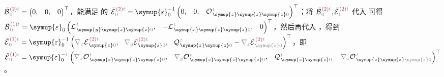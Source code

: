 $\bar{\mathcal{B}}^{\;\!\textcolor{Maroon}{(2)}\mathcolor{gray}{t}}_{\;\!  \mathcolor{gray}{0}} = \begin{pmatrix} 0, & 0, & 0 \end{pmatrix}^\top$，能满足  的 $\bar{\mathcal{E}}^{\;\!\textcolor{Maroon}{(2)}\mathcolor{gray}{t}}_{\;\!  \mathcolor{gray}{0}} = {\symup{\varepsilon}}_0^{-1} \begin{pmatrix} 0, & 0, & {\mathcal{O}}^{\;\!\mathcolor{gray}{t}}_{\;\! \symup{z} \symup{z} \symup{z} \mathcolor{gray}{0}} \end{pmatrix}^\top$；将 $\bar{\mathcal{B}}^{\;\!\textcolor{Maroon}{(2)}\mathcolor{gray}{t}}_{\;\!  \mathcolor{gray}{0}},\bar{\mathcal{E}}^{\;\!\textcolor{Maroon}{(2)}\mathcolor{gray}{t}}_{\;\! \mathcolor{gray}{0}}$ 代入  可得 $\bar{\mathcal{B}}^{\;\!\textcolor{Maroon}{(1)}\mathcolor{gray}{t}}_{\;\!  \mathcolor{gray}{0}} = {\symup{\varepsilon}}_0 \begin{pmatrix} {\mathcal{L}}^{\;\!\mathcolor{gray}{t}}_{\;\! \symup{y} \symup{z} \symup{z} \mathcolor{gray}{0}}, & - {\mathcal{L}}^{\;\!\mathcolor{gray}{t}}_{\;\! \symup{x} \symup{z} \symup{z} \mathcolor{gray}{0}}, & 0 \end{pmatrix}^\top$，然后再代入 ，得到 $\bar{\mathcal{E}}^{\;\!\textcolor{Maroon}{(1)}\mathcolor{gray}{t}}_{\;\!  \mathcolor{gray}{0}} = {\symup{\varepsilon}}_0^{-1} \left( \mathcolor{gray}{\nabla_x} \mathcal{E}^{\;\!\textcolor{Maroon}{(2)}\mathcolor{gray}{t}}_{\;\! \symup{z} \mathcolor{gray}{0}}, \right.$ $\left. \mathcolor{gray}{\nabla_y} \mathcal{E}^{\;\!\textcolor{Maroon}{(2)}\mathcolor{gray}{t}}_{\;\! \symup{z} \mathcolor{gray}{0}},~~ {\mathcal{Q}}^{\;\!\mathcolor{gray}{t}}_{\;\! \symup{z} \symup{z} \mathcolor{gray}{0}} - \mathcolor{gray}{\nabla_z} \mathcal{E}^{\;\!\textcolor{Maroon}{(2)}\mathcolor{gray}{t}}_{\;\! \mathcolor{gray}{\symup{z}} \mathcolor{gray}{0}} \right)^\top$，即 $\bar{\mathcal{E}}^{\;\!\textcolor{Maroon}{(1)}\mathcolor{gray}{t}}_{\;\!  \mathcolor{gray}{0}} = {\symup{\varepsilon}}_0^{-1} \begin{pmatrix} \mathcolor{gray}{\nabla_x} {\mathcal{O}}^{\;\!\mathcolor{gray}{t}}_{\;\! \symup{z} \symup{z} \symup{z} \mathcolor{gray}{0}}, & \mathcolor{gray}{\nabla_y} {\mathcal{O}}^{\;\!\mathcolor{gray}{t}}_{\;\! \symup{z} \symup{z} \symup{z} \mathcolor{gray}{0}}, & {\mathcal{Q}}^{\;\!\mathcolor{gray}{t}}_{\;\! \symup{z} \symup{z} \mathcolor{gray}{0}} - \mathcolor{gray}{\nabla_z} {\mathcal{O}}^{\;\!\mathcolor{gray}{t}}_{\;\! \symup{z} \symup{z} \mathcolor{gray}{\symup{z}} \mathcolor{gray}{0}} \end{pmatrix}^\top$。


